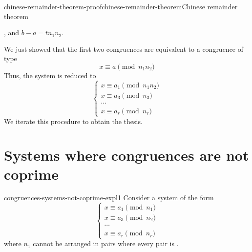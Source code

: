 \documentclass[preview]{standalone}
\begin{document}
\begin{snippetproof}{chinese-remainder-theorem-proof}{chinese-remainder-theorem}{Chinese remainder theorem}
\begin{itemize}
\begin{enumerate}
            \coprime, and \(b-a = tn_1n_2\).
        \end{enumerate}
        We just showed that the first two congruences are equivalent to a congruence of type
        \[
            x \equiv a \pmod{n_1n_2}
        \]
        Thus, the system is reduced to
        \[
            \begin{cases}
                x \equiv a_1 \pmod{n_1n_2} \\
                x \equiv a_3 \pmod{n_3} \\
                \cdots \\
                x \equiv a_r \pmod{n_r}
            \end{cases}
        \]
        We iterate this procedure to obtain the thesis.
    \end{itemize}
\end{snippetproof}

\section{Systems where congruences are not coprime}

\begin{snippet}{congruences-systems-not-coprime-expl1}
    Consider a system of the form
    \[
        \begin{cases}
            x \equiv a_1 \pmod{n_1} \\
            x \equiv a_3 \pmod{n_2} \\
            \cdots \\
            x \equiv a_r \pmod{n_r}
        \end{cases}
    \]
    where \(n_1\) cannot be arranged in pairs where every pair is \coprime.
\end{snippet}
\end{document}
